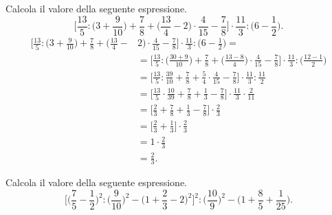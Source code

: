 \begin{exrig}
\begin{esempio}
  Calcola il valore della seguente espressione.
\[\bigg[\frac{13}{5}:\bigg(3+\frac{9}{10}\bigg)+\frac{7}{8}+\bigg(\frac{13}{4}-2\bigg)\cdot\frac{4}{15}-\frac{7}{8}%
\bigg]\cdot\frac{11}{3}:\bigg(6-\frac{1}{2}\bigg).\]
  \begin{align*}
\bigg[\frac{13}{5}:\bigg(3+\frac{9}{10}\bigg)+\frac{7}{8}+\bigg(\frac{13}{4}-&2\bigg)\cdot\frac{4}{15}-\frac{7}{8}%
\bigg]\cdot\frac{11}{3}:\bigg(6-\frac{1}{2}\bigg)=\\
&=
\bigg[\frac{13}{5}:\bigg(\frac{30+9}{10}\bigg)+\frac{7}{8}+\bigg(\frac{13-8}{4}\bigg)\cdot\frac{4}{15}-\frac{7}{8}%
\bigg]\cdot\frac{11}{3}:\bigg(\frac{12-1}{2}\bigg)\\
 &=
\bigg[\frac{13}{5}:\frac{39}{10}+\frac{7}{8}+\frac{5}{4}\cdot\frac{4}{15}-\frac{7}{8}%
\bigg]\cdot\frac{11}{3}:\frac{11}{2}\\
 &=
\bigg[\frac{13}{5}\cdot\frac{10}{39}+\frac{7}{8}+\frac{1}{3}-\frac{7}{8}%
\bigg]\cdot\frac{11}{3}\cdot\frac{2}{11}\\
 &=
\bigg[\frac{2}{3}+\frac{7}{8}+\frac{1}{3}-\frac{7}{8}%
\bigg]\cdot\frac{2}{3}\\
 &=
\bigg[\frac{2}{3}+\frac{1}{3}\bigg]\cdot\frac{2}{3}\\
&=1\cdot\frac{2}{3}\\
&=\frac{2}{3}.
  \end{align*}
\end{esempio}
\pagebreak
\begin{esempio}
   Calcola il valore della seguente espressione.
\[\bigg[\bigg(\frac{7}{5}-\frac{1}{2}\bigg)^{2}:\bigg(\frac{9}{10}\bigg)^{2}-\bigg(1+\frac{2}{3}-2\bigg)^{2}\bigg]^{2}:\bigg(\frac{10}{9}\bigg)^{2}-\bigg(1+\frac{8}{5}+\frac{1}{25}\bigg).\]


\end{esempio}
\end{exrig}
